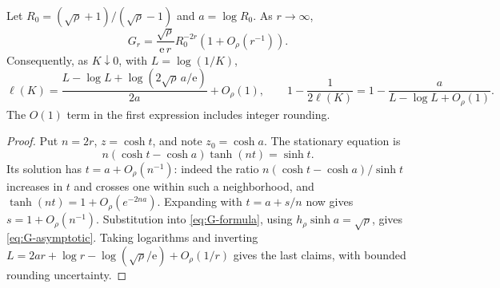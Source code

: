 \begin{proposition}\label{prop:threshold-asymptotics}
Let $R_0=(\sqrt\rho+1)/(\sqrt\rho-1)$ and $a=\log R_0$. As $r\to\infty$,
\begin{equation}\label{eq:G-asymptotic}
 G_r=\frac{\sqrt\rho}{\mathrm e\,r}R_0^{-2r}
 (1+O_\rho(r^{-1})).
\end{equation}
Consequently, as $K\downarrow0$, with $L=\log(1/K)$,
\[
 \ell(K)=\frac{L-\log L+\log(2\sqrt\rho\,a/\mathrm e)}{2a}+O_\rho(1),
 \qquad
 1-\frac1{2\ell(K)}
 =1-\frac{a}{L-\log L+O_\rho(1)}.
\]
The $O(1)$ term in the first expression includes integer rounding.
\end{proposition}
\begin{proof}
Put $n=2r$, $z=\cosh t$, and note $z_0=\cosh a$. The stationary equation is
\[
 n(\cosh t-\cosh a)\tanh(nt)=\sinh t.
\]
Its solution has $t=a+O_\rho(n^{-1})$: indeed the ratio $n(\cosh t-\cosh a)/\sinh t$ increases in $t$ and crosses one within such a neighborhood, and $\tanh(nt)=1+O_\rho(e^{-2na})$. Expanding with $t=a+s/n$ now gives $s=1+O_\rho(n^{-1})$. Substitution into \eqref{eq:G-formula}, using $h_\rho\sinh a=\sqrt\rho$, gives \eqref{eq:G-asymptotic}. Taking logarithms and inverting $L=2ar+\log r-\log(\sqrt\rho/\mathrm e)+O_\rho(1/r)$ gives the last claims, with bounded rounding uncertainty.
\end{proof}


